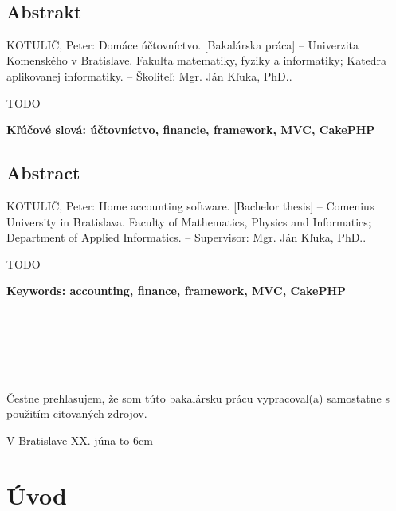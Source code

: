 \documentclass[12pt]{book}
\def\mftitle{Domáce účtovníctvo}
\def\mfthesistype{Bakalárska práca}
\begin{document}
\eject

\thispagestyle{empty}~\vfill\eject

\section*{Abstrakt}
KOTULIČ, Peter: \mftitle. [\mfthesistype] – Univerzita Komenského v Bratislave. Fakulta matematiky, fyziky a informatiky; Katedra aplikovanej informatiky. – Školiteľ: Mgr. Ján Kľuka, PhD.. 

TODO

{\bf Kľúčové slová: účtovníctvo, financie, framework, MVC, CakePHP}

\section*{Abstract}
KOTULIČ, Peter: Home accounting software. [Bachelor thesis] – Comenius University in Bratislava. Faculty of Mathematics, Physics and Informatics; Department of Applied Informatics. – Supervisor: Mgr. Ján Kľuka, PhD.. 

TODO

{\bf Keywords: accounting, finance, framework, MVC, CakePHP}

\eject

\thispagestyle{empty}~\vfill\eject

{~}\vspace{12cm}

\noindent
\begin{minipage}{0.25\textwidth}~\end{minipage}
\begin{minipage}{0.68\textwidth}
Čestne prehlasujem, že som túto bakalársku prácu vypracoval(a) samostatne s použitím citovaných zdrojov.

\bigskip\bigskip

V Bratislave XX. júna \hfill\hbox to 6cm{\dotfill}
\end{minipage}
\vfill\eject

\tableofcontents

\newpage


\mainmatter

\chapter{Úvod}\label{chap:intro}
\end{document}
